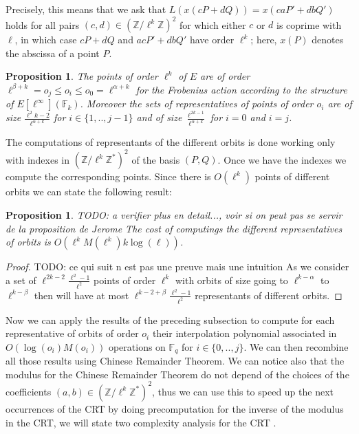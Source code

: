 \documentclass{lms}
\newcommand{\todo}[1]{{\color{red}TODO: #1}}
\newtheorem{prop}[thm]{Proposition}
\newcommand{\F}{\mathbb{F}}
\begin{document}
Precisely, this means that we ask that $L(x(cP+dQ))=x(caP'+dbQ')$
holds for all pairs $(c,d) \in (\mathbb{Z}/\ell^k\mathbb{Z})^2$ for
which either $c$ or $d$ is coprime with $\ell$, in which case $cP+dQ$
and $acP'+dbQ'$ have order $\ell^k$; here, $x(P)$ denotes the abscissa
of a point $P$.  
\newline
\begin{prop}
The points of order $\ell^k$ of $E$ are of order $\ell^{\beta+k}=o_j  \leqslant o_i \leqslant o_0=  \ell^{\alpha+k} $ for the Frobenius action according to the structure of $E[\ell^\infty](\F_k)$.
\newline
Moreover the sets of representatives of points of order $o_i$ are of size $\frac{\ell^2k-2}{\ell^{\alpha+k}}$ for $i \in \{1,..,j-1\}$ and of size $\frac{\ell^{2k-1}}{\ell^{\alpha+k}}$ for $i=0$ and $i=j$.
\end{prop}
The computations of representants of the different orbits is done working only with indexes in $(\mathbb{Z}/\ell^k \mathbb{Z}^*)^2$ of the basis $(P,Q)$. Once we have the indexes we compute the corresponding points. Since there is $O(\ell^k)$ points of different orbits we can state the following result:

\begin{prop}\todo{a verifier plus en detail..., voir si on peut pas se servir de la proposition de Jerome}
The cost of computings the different representatives of orbits is $O(\ell^kM(\ell^k)k \log(\ell))$.
\end{prop}

\begin{proof}
\todo{ce qui suit n est pas une preuve mais une intuition}
As we consider a set of $\ell^{2k-2}\frac{\ell^2-1}{\ell^2}$ points of order $\ell^k$ with orbits of size going to $\ell^{k-\alpha}$ to $\ell^{k-\beta}$ then will have at most $\ell^{k-2+\beta}\frac{\ell^2-1}{\ell^2}$ representants of different orbits.
\end{proof}

Now we can apply the results of the preceding subsection to compute for each representative of orbits of order $o_i$ their interpolation polynomial associated in $O(\log(o_i)M(o_i))$ operations on $\mathbb{F}_q$ for $i \in \{0,..,j\}$. We can then recombine all those results using Chinese Remainder Theorem. We can notice also that the modulus for the Chinese Remainder Theorem do not depend of the choices of the coefficients $(a,b) \in (\mathbb{Z}/\ell^k \mathbb{Z}^*)^2$, thus we can use this to speed up the next occurrences of the CRT by doing precomputation for the inverse of the modulus in the CRT, we will state two complexity analysis for the CRT .
\end{document}
